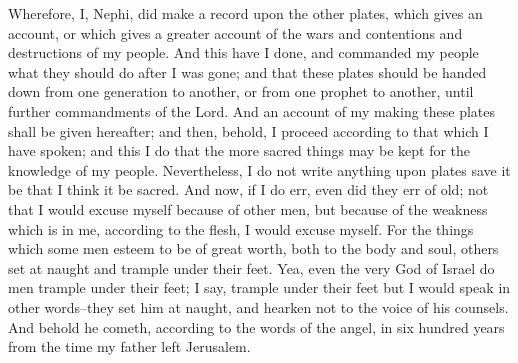Wherefore, I, Nephi, did make a record upon the other plates, which gives an account, or which gives a greater account of the wars and contentions and destructions of my people. And this have I done, and commanded my people what they should do after I was gone; and that these plates should be handed down from one generation to another, or from one prophet to another, until further commandments of the Lord.
\bverse \iffalse And an account of my making these plates shall be given hereafter; and then, behold, I proceed according to that which I have spoken; and this I do that the more sacred things may be kept for the knowledge of my people. \fi
And an account of my making these plates shall be given hereafter; and then, behold, I proceed according to that which I have spoken; and this I do that the more sacred things may be kept for the knowledge of my people.
\bverse \iffalse Nevertheless, I do not write anything upon plates save it be that I think it be sacred. And now, if I do err, even did they err of old; not that I would excuse myself because of other men, but because of the weakness which is in me, according to the flesh, I would excuse myself. \fi
Nevertheless, I do not write anything upon plates save it be that I think it be sacred. And now, if I do err, even did they err of old; not that I would excuse myself because of other men, but because of the weakness which is in me, according to the flesh, I would excuse myself.
\bverse \iffalse For the things which some men esteem to be of great worth, both to the body and soul, others set at naught and trample under their feet. Yea, even the very God of Israel do men trample under their feet; I say, trample under their feet but I would speak in other words--they set him at naught, and hearken not to the voice of his counsels. \fi
For the things which some men esteem to be of great worth, both to the body and soul, others set at naught and trample under their feet. Yea, even the very God of Israel do men trample under their feet; I say, trample under their feet but I would speak in other words--they set him at naught, and hearken not to the voice of his counsels.
\bverse \iffalse And behold he cometh, according to the words of the angel, in six hundred years from the time my father left Jerusalem. \fi
And behold he cometh, according to the words of the angel, in six hundred years from the time my father left Jerusalem.
\bverse \iffalse And the world, because of their iniquity, shall judge him to be a thing of naught; wherefore they scourge him, and he suffereth it; and they smite him, and he suffereth it. Yea, they spit upon him, and he suffereth it, because of his loving kindness and his long-suffering towards the children of men. \fi
